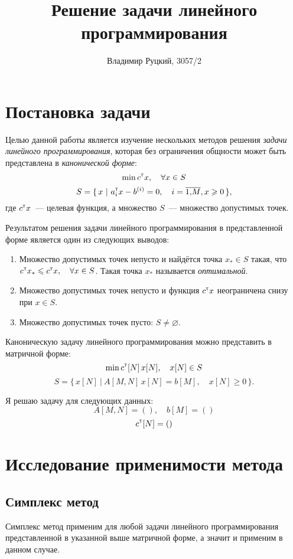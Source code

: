 \documentclass[10pt,a4paper,titlepage]{article}
\title{Решение задачи линейного программирования}
\author{Владимир Руцкий, 3057/2}
\newcommand\T{^\mathrm{\textsf{\tiny{T}}}}
\begin{document}
\maketitle
\thispagestyle{empty}

\section{Постановка задачи}
Целью данной работы является изучение нескольких методов решения \textit{задачи линейного программирования}, 
которая без ограничения общности может быть представлена в \textit{канонической форме}:
$$ \min c\T x, \quad \forall x \in S $$
$$ S = \{ \, x\ |\ a_i\T x - b^{(i)} = 0, \quad i = \overline{1,\!M}, x \geqslant 0 \, \},$$
где $c\T x$~--- целевая функция, а множество $S$~--- множество допустимых точек.

Результатом решения задачи линейного программирования в представленной форме является один из следующих выводов:
\begin{enumerate}
  \item Множество допустимых точек непусто и найдётся точка $x_* \in S$ такая, что $c\T x_* \leqslant c\T x, \quad \forall x \in S$. 
Такая точка $x_*$ называется \textit{оптимальной}.
  \item Множество допустимых точек непусто и функция $c\T x$ неограничена снизу при $x \in S$.
  \item Множество допустимых точек пусто: $S \ne \varnothing$.
\end{enumerate}

Каноническую задачу линейного программирования можно представить в матричной форме:
$$ \min c\T[N] \, x[N], \quad x[N] \in S $$
$$ S = \{ \, x[N]\ |\ A[M,N] \, x[N] = b[M], \quad x[N] \geqslant 0 \, \}.$$

Я решаю задачу для следующих данных:
$$A[M,N] = \left(  \right), \quad
b[M] = \left(  \right)$$
$$c\T[N] = \left(  \right)$$

\section{Исследование применимости метода}

\subsection{Симплекс метод}
Симплекс метод применим для любой задачи линейного программирования представленной в указанной выше матричной форме,
а значит и применим в данном случае.
\end{document}
